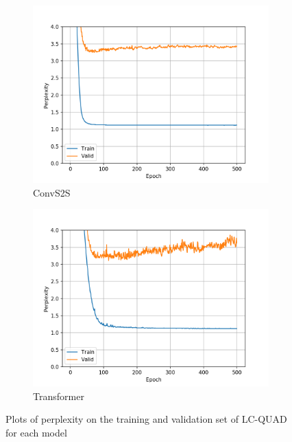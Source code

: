 \begin{figure}[h]
\begin{subfigure}{0.3\textwidth}
\includegraphics[width=\textwidth]{../results/lc-quad1/run2/fconv_wmt_en_de/ppls.png} 
\caption{ConvS2S}
\label{fig:lcquad convs2s ppl}
\end{subfigure}
\hfill
\begin{subfigure}{0.3\textwidth}
\includegraphics[width=\textwidth]{../results/lc-quad1/run1/transformer_iwslt_de_en/ppls.png}
\caption{Transformer}
\label{fig:lcquad transformer ppl}
\end{subfigure}
\hfill
\caption{Plots of perplexity on the training and validation set of LC-QUAD for each model}
\label{fig:lcquad ppls}
\end{figure}

